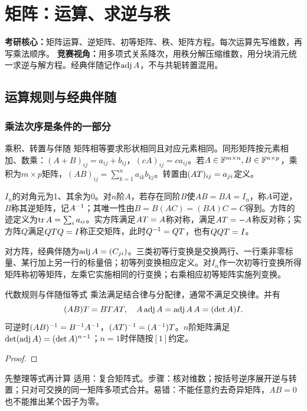 \chapter{矩阵：运算、求逆与秩}\label{ch:matrix}
\begin{examtip}
\textbf{考研核心：}矩阵运算、逆矩阵、初等矩阵、秩、矩阵方程。每次运算先写维数，再写乘法顺序。
\textbf{竞赛视角：}用多项式关系降次，用秩分解压缩维数，用分块消元统一求逆与解方程。经典伴随记作$\operatorname{adj} A$，不与共轭转置混用。
\end{examtip}
\section{运算规则与经典伴随}
\subsection{乘法次序是条件的一部分}
\begin{definition}{乘积、转置与伴随}
矩阵相等要求形状相同且对应元素相同。同形矩阵按元素相加、数乘：$(A+B)_{ij}=a_{ij}+b_{ij}$，$(cA)_{ij}=ca_{ij}$。若$A\in\mathbb{F}^{m\times n},B\in\mathbb{F}^{n\times p}$，乘积为$m\times p$矩阵，$(AB)_{ij}=\sum_{k=1}^n a_{ik}b_{kj}$。转置由$(AT)_{ij}=a_{ji}$定义。

$I_n$的对角元为1、其余为0。对$n$阶$A$，若存在同阶$B$使$AB=BA=I_n$，称$A$可逆，$B$称其逆矩阵，记$A^{-1}$；其唯一性由$B=B(AC)=(BA)C=C$得到。方阵的迹定义为$\operatorname{tr} A=\sum_i a_{ii}$。实方阵满足$AT=A$称对称，满足$AT=-A$称反对称；实方阵$Q$满足$QT Q=I$称正交矩阵，此时$Q^{-1}=QT$，也有$QQT=I$。

对方阵，经典伴随为$\operatorname{adj} A=(C_{ji})$。三类初等行变换是交换两行、一行乘非零标量、某行加上另一行的标量倍；初等列变换相应定义。对$I_n$作一次初等行变换所得矩阵称初等矩阵，左乘它实施相同的行变换；右乘相应初等矩阵实施列变换。
\end{definition}
\begin{theorem}{代数规则与伴随恒等式}
乘法满足结合律与分配律，通常不满足交换律。并有
\begin{equation}(AB)T=BT AT,\quad A\operatorname{adj} A=\operatorname{adj} A\,A=(\det A)I.\label{eq:adj}\end{equation}
可逆时$(AB)^{-1}=B^{-1} A^{-1}$，$(AT)^{-1}=(A^{-1})T$。$n$阶矩阵满足$\det(\operatorname{adj} A)=(\det A)^{n-1}$；$n=1$时伴随按$[1]$约定。
\end{theorem}
\begin{proof}

\end{proof}
\begin{method}{先整理等式再计算}
适用：复合矩阵式。步骤：核对维数；按括号逆序展开逆与转置；只对可交换的同一矩阵多项式合并。易错：不能任意约去奇异矩阵，$AB=0$也不能推出某个因子为零。
\end{method}
